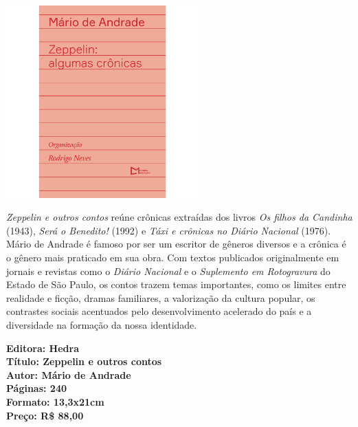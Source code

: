 \pagestyle{hedra}
\label{hedra}



\begin{center}
\hspace*{-3.6cm}
\hspace*{3.1cm}\includegraphics[width=74mm]{./grid/zepelin.png}
\end{center}

\hspace*{-7cm}\hrulefill\hspace*{-7cm}

\medskip

\noindent{}\textit{Zeppelin e outros contos} reúne crônicas extraídas dos livros \textit{Os
filhos da Candinha} (1943), \textit{Será o Benedito!} (1992) e \textit{Táxi e crônicas no Diário Nacional} (1976). Mário de Andrade é famoso por ser um escritor de gêneros diversos e a crônica é o gênero mais praticado em sua obra.
Com textos publicados originalmente em jornais e revistas como o \textit{Diário Nacional} e o \textit{Suplemento em Rotogravura} do Estado de São Paulo, os contos trazem temas importantes, como os limites entre realidade e ficção, dramas familiares, a valorização da cultura popular, os contrastes sociais acentuados pelo desenvolvimento acelerado do país e a diversidade na formação da nossa identidade.

\vfill

\noindent\begin{minipage}[c]{1\linewidth}
{\small\textbf{
\hspace*{-.1cm}Editora: Hedra\\
Título: Zeppelin e outros contos\\
Autor: Mário de Andrade\\ 
Páginas: 240\\
Formato: 13,3x21cm\\
Preço: R\$ 88,00\\
}}
\end{minipage}

